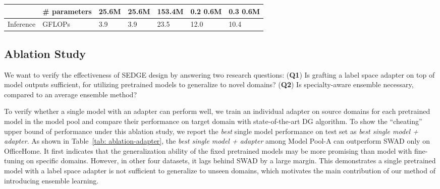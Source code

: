 \documentclass{article}
\newcommand{\method}{\textsc{SEDGE}\xspace}
\begin{document}
\begin{table}[]
{\begin{tabular}{ll|l|l|l|l|l}
\multicolumn{1}{l|}{}                          & \# parameters  & \multicolumn{1}{l|}{25.6M} & \multicolumn{1}{l|}{25.6M}  & \multicolumn{1}{l|}{153.4M}                               & \multicolumn{1}{l|}{0.2  0.6M}                                     & \multicolumn{1}{l}{0.3  0.6M}                                    \\ \hline
\multicolumn{1}{l|}{Inference}                 & GFLOPs     & \multicolumn{1}{l|}{3.9}                            & \multicolumn{1}{l|}{3.9}                              & \multicolumn{1}{l|}{23.5}                            & \multicolumn{1}{l|}{12.0}                            & \multicolumn{1}{l}{10.4} 
\\ \hline
\end{tabular}}
\label{tab:flops_param_comp}
\end{table}




\subsection{Ablation Study}\label{sec:ablation}

We want to verify the effectiveness of \method design by answering two research questions:
(\textbf{Q1}) Is grafting a label space adapter on top of model outputs sufficient, for utilizing pretrained models to generalize to novel domains?
(\textbf{Q2}) Is specialty-aware ensemble necessary, compared to an average ensemble method?


To verify whether a single model with an adapter can perform well, we train an individual adapter on source domains for each pretrained model in the model pool and compare their performance on target domain with state-of-the-art DG algorithm.
To show the ``cheating'' upper bound of performance under this ablation study, we report the \textit{best} single model performance on test set as \textit{best single model + adapter}.
As shown in Table~\ref{tab: ablation-adapter}, the \textit{best single model + adapter} among Model Pool-A can outperform SWAD only on OfficeHome.
It first indicates that the generalization ability of the fixed pretrained models may be more promising than model with fine-tuning on specific domains.
However, in other four datasets, it lags behind SWAD by a large margin.
This demonstrates a single pretrained model with a label space adapter is not sufficient to generalize to unseen domains, which motivates the main contribution of our method of introducing ensemble learning.
\end{document}
